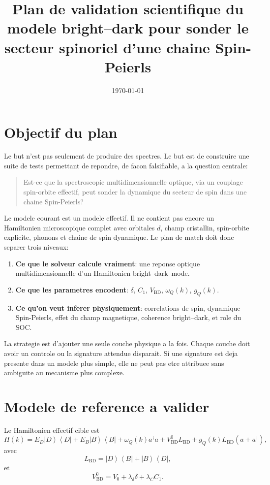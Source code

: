 \documentclass[11pt]{article}
\title{Plan de validation scientifique du modele bright--dark pour sonder le secteur spinoriel d'une chaine Spin-Peierls}
\author{}
\date{\today}
\newcommand{\op}[2]{\left|#1\right\rangle\left\langle #2\right|}
\begin{document}
\maketitle

\section{Objectif du plan}

Le but n'est pas seulement de produire des spectres. Le but est de construire une suite de tests permettant de repondre, de facon falsifiable, a la question centrale:
\begin{quote}
Est-ce que la spectroscopie multidimensionnelle optique, via un couplage spin-orbite effectif, peut sonder la dynamique du secteur de spin dans une chaine Spin-Peierls?
\end{quote}

Le modele courant est un modele effectif. Il ne contient pas encore un Hamiltonien microscopique complet avec orbitales \(d\), champ cristallin, spin-orbite explicite, phonons et chaine de spin dynamique. Le plan de match doit donc separer trois niveaux:
\begin{enumerate}
    \item \textbf{Ce que le solveur calcule vraiment}: une reponse optique multidimensionnelle d'un Hamiltonien bright--dark--mode.
    \item \textbf{Ce que les parametres encodent}: \(\delta\), \(C_1\), \(V_{\mathrm{BD}}\), \(\omega_Q(k)\), \(g_Q(k)\).
    \item \textbf{Ce qu'on veut inferer physiquement}: correlations de spin, dynamique Spin-Peierls, effet du champ magnetique, coherence bright--dark, et role du SOC.
\end{enumerate}

La strategie est d'ajouter une seule couche physique a la fois. Chaque couche doit avoir un controle ou la signature attendue disparait. Si une signature est deja presente dans un modele plus simple, elle ne peut pas etre attribuee sans ambiguite au mecanisme plus complexe.

\section{Modele de reference a valider}

Le Hamiltonien effectif cible est
\begin{equation}
H(k)
=
E_D\op{D}{D}
+
E_B\op{B}{B}
+
\omega_Q(k)a^\dagger a
+
V_{\mathrm{BD}}^0 L_{\mathrm{BD}}
+
g_Q(k)L_{\mathrm{BD}}(a+a^\dagger),
\end{equation}
avec
\begin{equation}
L_{\mathrm{BD}}
=
\op{D}{B}+\op{B}{D},
\end{equation}
et
\begin{equation}
V_{\mathrm{BD}}^0
=
V_0+\lambda_\delta\delta+\lambda_C C_1.
\end{equation}
\end{document}
